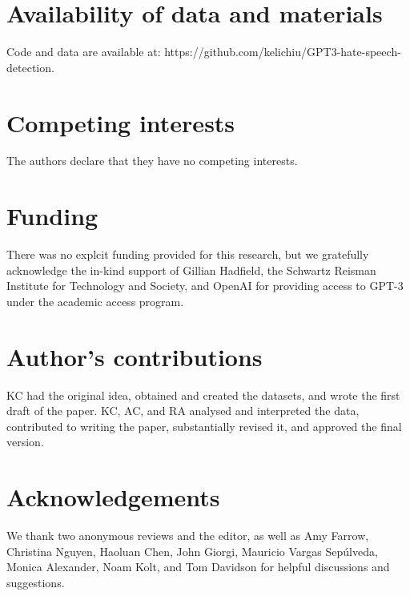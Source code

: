 \documentclass{bmcart}
\begin{document}
\begin{backmatter}

\section*{Availability of data and materials}
Code and data are available at: https://github.com/kelichiu/GPT3-hate-speech-detection. 

\section*{Competing interests}
  The authors declare that they have no competing interests.
  
\section*{Funding}
There was no explcit funding provided for this research, but we gratefully acknowledge the in-kind support of Gillian Hadfield, the Schwartz Reisman Institute for Technology and Society, and OpenAI for providing access to GPT-3 under the academic access program. 

\section*{Author's contributions}
  KC had the original idea, obtained and created the datasets, and wrote the first draft of the paper. KC, AC, and RA analysed and interpreted the data, contributed to writing the paper, substantially revised it, and approved the final version.

\section*{Acknowledgements}
  We thank two anonymous reviews and the editor, as well as Amy Farrow, Christina Nguyen, Haoluan Chen, John Giorgi, Mauricio Vargas Sepúlveda, Monica Alexander, Noam Kolt, and Tom Davidson for helpful discussions and suggestions.
  


\end{backmatter}
\end{document}
